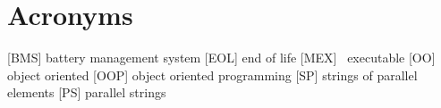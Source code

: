 \section*{Acronyms}
\thispagestyle{plain}
\begin{acronym}
	[BMS] battery management system
	[EOL] end of life
	[MEX] \matlab\ executable
	[OO] object oriented
	[OOP] object oriented programming
	[SP] strings of parallel elements
	[PS] parallel strings
\end{acronym}